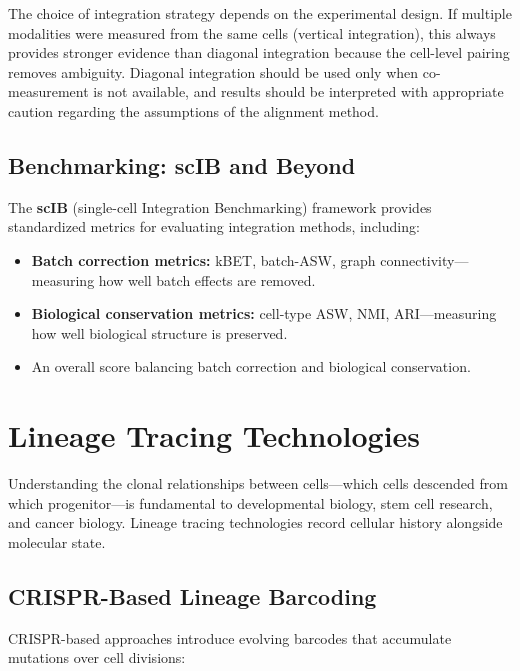 \begin{keyconcept}[title={Choosing an Integration Strategy}]
The choice of integration strategy depends on the experimental design. If multiple modalities were measured from the same cells (vertical integration), this always provides stronger evidence than diagonal integration because the cell-level pairing removes ambiguity. Diagonal integration should be used only when co-measurement is not available, and results should be interpreted with appropriate caution regarding the assumptions of the alignment method.
\end{keyconcept}

\subsection{Benchmarking: scIB and Beyond}
\label{subsec:multiomics:benchmarking}

The \textbf{scIB} (single-cell Integration Benchmarking) framework provides standardized metrics for evaluating integration methods, including:
\begin{itemize}[itemsep=2pt]
  \item \textbf{Batch correction metrics:} kBET, batch-ASW, graph connectivity---measuring how well batch effects are removed.
  \item \textbf{Biological conservation metrics:} cell-type ASW, NMI, ARI---measuring how well biological structure is preserved.
  \item An overall score balancing batch correction and biological conservation.
\end{itemize}


\section{Lineage Tracing Technologies}
\label{sec:multiomics:lineage}

Understanding the clonal relationships between cells---which cells descended from which progenitor---is fundamental to developmental biology, stem cell research, and cancer biology. Lineage tracing technologies record cellular history alongside molecular state.

\subsection{CRISPR-Based Lineage Barcoding}
\label{subsec:multiomics:crispr-barcoding}

CRISPR-based approaches introduce evolving barcodes that accumulate mutations over cell divisions:

